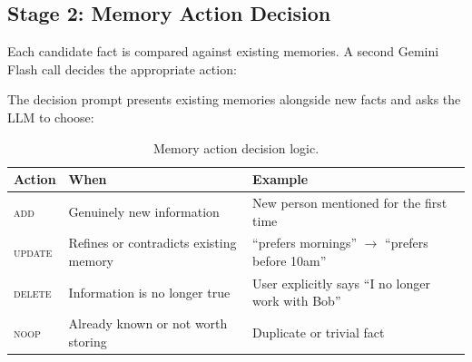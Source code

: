 \documentclass[11pt, letterpaper]{article}
\begin{document}
\subsection{Stage 2: Memory Action Decision}

Each candidate fact is compared against existing memories. A second Gemini Flash call
decides the appropriate action:

\begin{center}
\end{center}

\noindent The decision prompt presents existing memories alongside new facts and asks
the LLM to choose:

\begin{table}[h]
\centering
\small
\begin{tabularx}{\textwidth}{lXX}
\toprule
\textbf{Action} & \textbf{When} & \textbf{Example} \\
\midrule
\textsc{add} & Genuinely new information & New person mentioned for the first time \\
\textsc{update} & Refines or contradicts existing memory & ``prefers mornings'' $\rightarrow$ ``prefers before 10am'' \\
\textsc{delete} & Information is no longer true & User explicitly says ``I no longer work with Bob'' \\
\textsc{noop} & Already known or not worth storing & Duplicate or trivial fact \\
\bottomrule
\end{tabularx}
\caption{Memory action decision logic.}
\end{table}
\end{document}
